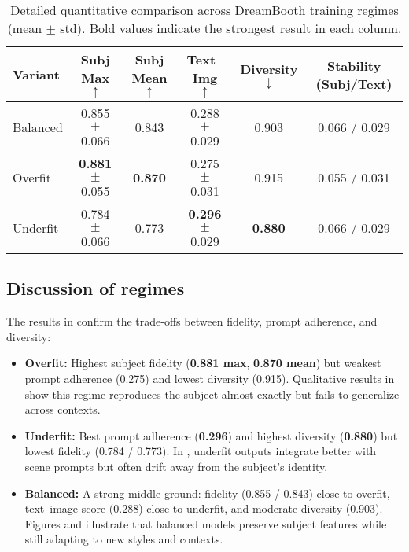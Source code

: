\documentclass[11pt]{article}
\begin{document}
\begin{table}[h]
  \centering
  \caption{Detailed quantitative comparison across DreamBooth training regimes (mean $\pm$ std). Bold values indicate the strongest result in each column.}
  \label{tab:regimes_detailed}
  \begin{tabular}{lccccc}
    \toprule
    Variant & Subj Max $\uparrow$ & Subj Mean $\uparrow$ & Text--Img $\uparrow$ & Diversity $\downarrow$ & Stability (Subj/Text) \\
    \midrule
    Balanced & 0.855 $\pm$ 0.066 & 0.843 & 0.288 $\pm$ 0.029 & 0.903 & 0.066 / 0.029 \\
    Overfit  & \textbf{0.881} $\pm$ 0.055 & \textbf{0.870} & 0.275 $\pm$ 0.031 & 0.915 & 0.055 / 0.031 \\
    Underfit & 0.784 $\pm$ 0.066 & 0.773 & \textbf{0.296} $\pm$ 0.029 & \textbf{0.880} & 0.066 / 0.029 \\
    \bottomrule
  \end{tabular}
\end{table}

\subsection{Discussion of regimes}
The results in  confirm the trade-offs between fidelity, prompt adherence, and diversity:

\begin{itemize}
  \item \textbf{Overfit:} Highest subject fidelity (\textbf{0.881 max}, \textbf{0.870 mean}) but weakest prompt adherence (0.275) and lowest diversity (0.915). Qualitative results in  show this regime reproduces the subject almost exactly but fails to generalize across contexts.
  \item \textbf{Underfit:} Best prompt adherence (\textbf{0.296}) and highest diversity (\textbf{0.880}) but lowest fidelity (0.784 / 0.773). In , underfit outputs integrate better with scene prompts but often drift away from the subject’s identity.
  \item \textbf{Balanced:} A strong middle ground: fidelity (0.855 / 0.843) close to overfit, text--image score (0.288) close to underfit, and moderate diversity (0.903). Figures  and  illustrate that balanced models preserve subject features while still adapting to new styles and contexts.
\end{itemize}
\end{document}
